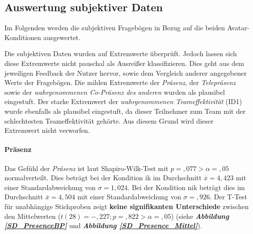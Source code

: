 \documentclass[a4paper,11pt]{article}%
\renewcommand{\\}{\vspace*{0.5\baselineskip} \newline}
\begin{document}
{%

\newpage
\subsection{Auswertung subjektiver Daten}
Im Folgenden werden die subjektiven Fragebögen in Bezug auf die beiden Avatar-Konditionen ausgewertet.

Die subjektiven Daten wurden auf Extremwerte überprüft. Jedoch lassen sich diese Extremwerte nicht pauschal als Ausreißer klassifizieren. Dies geht aus dem jeweiligen Feedback der Nutzer hervor, sowie dem Vergleich anderer angegebener Werte der Fragebögen. Die milden Extremwerte der \textit{Präsenz}, der \textit{Telepräsenz} sowie der \textit{wahrgenommenen Co-Präsenz des anderen} wurden als plausibel eingestuft. 
Der starke Extremwert der \textit{wahrgenommenen Teameffektivität} (ID1) wurde ebenfalls als plausibel eingestuft, da dieser Teilnehmer zum Team mit der schlechtesten Teameffektivität gehörte. Aus diesem Grund wird dieser Extremwert nicht verworfen.

\paragraph{Präsenz}
Das Gefühl der \textit{Präsenz} ist laut Shapiro-Wilk-Test mit $p =,077 > \alpha = ,05$ normalverteilt. 
Dies beträgt bei der Kondition \ac{ik} im Durchschnitt $\bar{x} = 4,423$ mit einer Standardabweichung von $\sigma = 1,024$.
Bei der Kondition \ac{nik} beträgt dies im Durchschnitt $\bar{x} = 4,504$ mit einer Standardabweichung von $\sigma =,926$.
Der T-Test für unabhängige Stichproben zeigt \textbf{keine signifikanten Unterschiede} zwischen den Mittelwerten ($t(28) = -,227; p =,822 > \alpha = ,05$) (siehe \textbf{\textit{Abbildung \ref{SD_PresenceBP}}} und \textbf{\textit{Abbildung \ref{SD_Presence_Mittel}}}).

}
\end{document}
